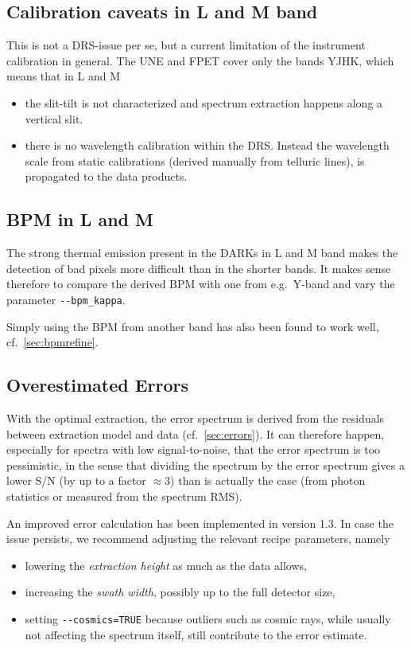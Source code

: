 \subsection{Calibration caveats in L and M band}

This is not a DRS-issue per se, but a current limitation of the instrument
calibration in general. The UNE and FPET cover only the bands YJHK, which means
that in L and M
\begin{itemize}
    \item the slit-tilt is not characterized and spectrum extraction happens
    along a vertical slit.
    \item there is no wavelength calibration within the DRS. Instead the
    wavelength scale from static calibrations (derived manually from telluric
    lines), is propagated to the data products.
\end{itemize}


\subsection{BPM in L and M}

The strong thermal emission present in the DARKs in L and M band makes the
detection of bad pixels more difficult than in the shorter bands. It makes sense
therefore to compare the derived BPM with one from e.g.~Y-band and vary the
parameter \verb!--bpm_kappa!.

Simply using the BPM from another band has also been found to work well, cf.~\ref*{sec:bpmrefine}.

\subsection{Overestimated Errors}
\label{sec:erroroverest}
With the optimal extraction, the error spectrum is derived from the residuals
between extraction model and data (cf.~\ref{sec:errors}). It can therefore
happen, especially for spectra with low signal-to-noise, that the error spectrum
is too pessimistic, in the sense that dividing the spectrum by the error
spectrum gives a lower S/N (by up to a factor $\approx 3$) than is actually the
case (from photon statistics or measured from the spectrum RMS).

An improved error calculation has been implemented in version 1.3. In case the
issue persists, we recommend adjusting the relevant recipe parameters, namely
\begin{itemize}
    \item lowering the \emph{extraction height} as much as the data allows,
    \item increasing the \emph{swath width}, possibly up to the full detector
    size,
    \item setting \verb!--cosmics=TRUE! because outliers such as cosmic rays,
    while usually not affecting the spectrum itself, still contribute to the
    error estimate.
\end{itemize}


